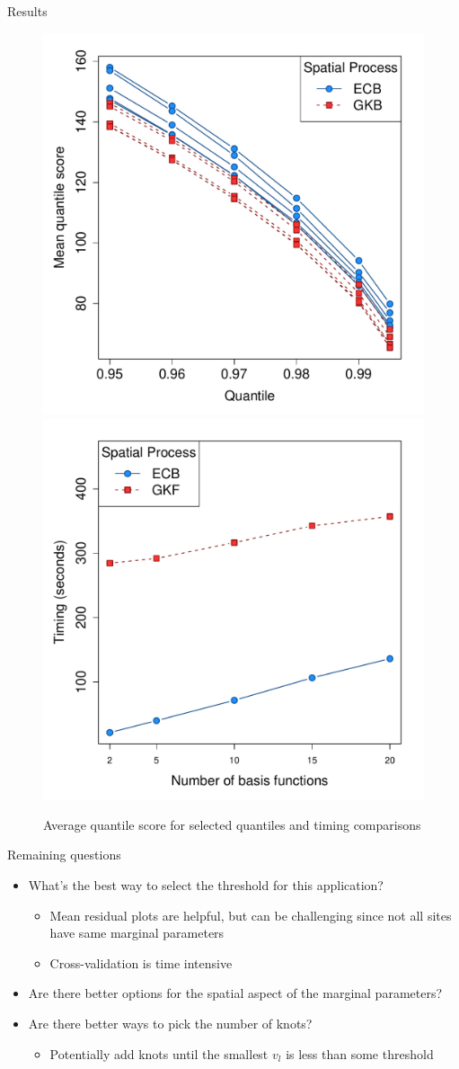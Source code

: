 \documentclass{beamer}
\begin{document}
\begin{frame}{Results}
  \begin{figure}  %
    \centering
    \includegraphics[width=0.47\linewidth]{plots/qs-mean}
    \includegraphics[width=0.47\linewidth]{plots/timing}
    \caption{Average quantile score for selected quantiles and timing comparisons}
    \label{fig:avgqscore}
  \end{figure}
\end{frame}

\begin{frame}{Remaining questions}
  \begin{itemize} \setlength{\itemsep}{1em}
    \item What's the best way to select the threshold for this application?
    \begin{itemize} \setlength{\itemsep}{0.5em}
      \item Mean residual plots are helpful, but can be challenging since not all sites have same marginal parameters
      \item Cross-validation is time intensive
    \end{itemize}
    \item Are there better options for the spatial aspect of the marginal parameters?
    \item Are there better ways to pick the number of knots?
    \begin{itemize}\setlength{\itemsep}{0.5em}
      \item Potentially add knots until the smallest $v_l$ is less than some threshold
    \end{itemize}
  \end{itemize}
\end{frame}
\end{document}
